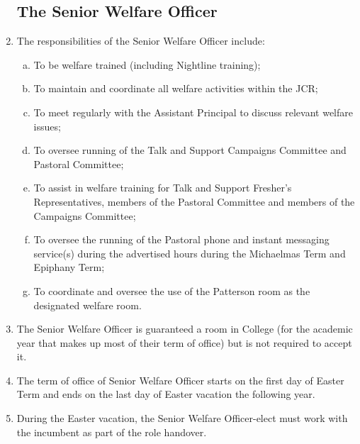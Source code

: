 \documentclass[12pt]{article}
\begin{document}
\begin{enumerate}
    \subsection{The Senior Welfare Officer}
    \item The responsibilities of the Senior Welfare Officer include:
    \begin{enumerate}[(a)]
        \item To be welfare trained (including Nightline training);
        \item To maintain and coordinate all welfare activities within the JCR;
        \item To meet regularly with the Assistant Principal to discuss relevant welfare issues;
        \item To oversee running of the Talk and Support Campaigns Committee and Pastoral Committee;
        \item To assist in welfare training for Talk and Support Fresher's Representatives, members of the Pastoral Committee and members of the Campaigns Committee;
        \item To oversee the running of the Pastoral phone and instant messaging service(s) during the advertised hours during the Michaelmas Term and Epiphany Term;
        \item To coordinate and oversee the use of the Patterson room as the designated welfare room.
    \end{enumerate}
    \item The Senior Welfare Officer is guaranteed a room in College (for the academic year that makes up most of their term of office) but is not required to accept it.
    \item The term of office of Senior Welfare Officer starts on the first day of Easter Term and ends on the last day of Easter vacation the following year.
    \item During the Easter vacation, the Senior Welfare Officer-elect must work with the incumbent as part of the role handover.

\end{enumerate}
\end{document}
